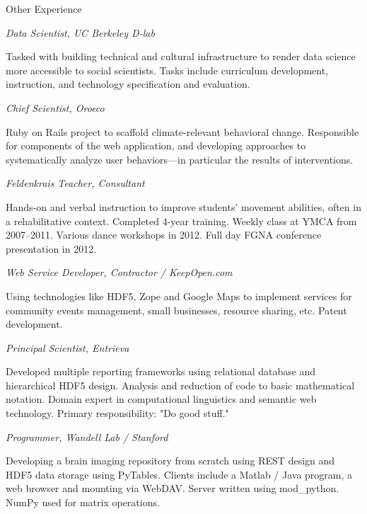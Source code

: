 \begin{rubric}{Other Experience}

\entry*[2013--present] \emph{Data Scientist, UC Berkeley D-lab}
    \par Tasked with building technical and cultural infrastructure to render
    data science more accessible to social scientists. Tasks include curriculum
    development, instruction, and technology specification and evaluation.

\entry*[2012--present] \emph{Chief Scientist, Oroeco}
    \par Ruby on Rails project to scaffold climate-relevant behavioral change.
    Responsible for components of the web application, and developing approaches
    to systematically analyze user behaviors---in particular the results of
    interventions.

\entry*[2007--present] \emph{Feldenkrais Teacher, Consultant}
    \par  Hands-on and verbal instruction to improve students' movement
    abilities, often in a rehabilitative context.
    Completed 4-year training. Weekly class at YMCA from 2007--2011. Various
    dance workshops in 2012. Full day FGNA conference presentation in 2012.


\entry*[2004--2013] \emph{Web Service Developer, Contractor / KeepOpen.com}
    \par Using technologies like HDF5, Zope and Google Maps to implement services
    for community events management, small businesses, resource sharing, etc.
    Patent development.

\entry*[2006--2007] \emph{Principal Scientist, Entrieva}
    \par Developed multiple reporting frameworks using relational database and
    hierarchical HDF5 design.  Analysis and reduction of code to basic
    mathematical notation.  Domain expert in computational linguistics and
    semantic web technology.  Primary responsibility: "Do good stuff."

\entry*[2006] \emph{Programmer, Wandell Lab / Stanford}
    \par Developing a brain imaging repository from scratch using REST design
    and HDF5 data storage using PyTables.  Clients include a Matlab /
    Java program, a web browser and mounting via WebDAV.  Server
    written using mod_python.  NumPy used for matrix operations.


\end{rubric}
